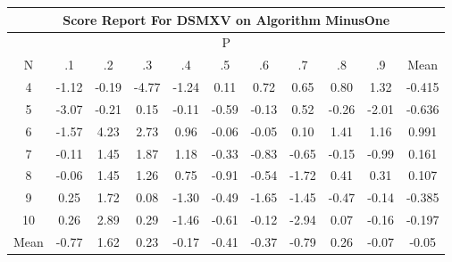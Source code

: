 \documentclass[11pt,a4paper]{report}
\begin{document}
\begin{longtable}{ | c || c | c | c | c | c | c | c | c | c || c |}
\hline
\multicolumn{11}{|c|}{ Score Report For DSMXV on Algorithm MinusOne} \\
\hline
\multicolumn{11}{|c|}{ P } \\
\hline
N & .1 & .2 & .3 & .4 & .5 & .6 & .7 & .8 & .9 & Mean\\
 \hline
 \hline
 \endhead
  4 &  \cellcolor[HTML]{FFDFDF} -1.12 &  \cellcolor[HTML]{FFF7F7} -0.19 &  \cellcolor[HTML]{FF8787} -4.77 &  \cellcolor[HTML]{FFDFDF} -1.24 &  \cellcolor[HTML]{FFFFFF} 0.11 &  \cellcolor[HTML]{EFEFFF} 0.72 &  \cellcolor[HTML]{EFEFFF} 0.65 &  \cellcolor[HTML]{E7E7FF} 0.80 &  \cellcolor[HTML]{DFDFFF} 1.32 & -0.415 \\
  5 &  \cellcolor[HTML]{FFAFAF} -3.07 &  \cellcolor[HTML]{FFF7F7} -0.21 &  \cellcolor[HTML]{FFFFFF} 0.15 &  \cellcolor[HTML]{FFFFFF} -0.11 &  \cellcolor[HTML]{FFEFEF} -0.59 &  \cellcolor[HTML]{FFFFFF} -0.13 &  \cellcolor[HTML]{EFEFFF} 0.52 &  \cellcolor[HTML]{FFF7F7} -0.26 &  \cellcolor[HTML]{FFCFCF} -2.01 & -0.636 \\
  6 &  \cellcolor[HTML]{FFD7D7} -1.57 &  \cellcolor[HTML]{9797FF} 4.23 &  \cellcolor[HTML]{B7B7FF} 2.73 &  \cellcolor[HTML]{E7E7FF} 0.96 &  \cellcolor[HTML]{FFFFFF} -0.06 &  \cellcolor[HTML]{FFFFFF} -0.05 &  \cellcolor[HTML]{FFFFFF} 0.10 &  \cellcolor[HTML]{DFDFFF} 1.41 &  \cellcolor[HTML]{DFDFFF} 1.16 & 0.991 \\
  7 &  \cellcolor[HTML]{FFFFFF} -0.11 &  \cellcolor[HTML]{D7D7FF} 1.45 &  \cellcolor[HTML]{CFCFFF} 1.87 &  \cellcolor[HTML]{DFDFFF} 1.18 &  \cellcolor[HTML]{FFF7F7} -0.33 &  \cellcolor[HTML]{FFE7E7} -0.83 &  \cellcolor[HTML]{FFEFEF} -0.65 &  \cellcolor[HTML]{FFFFFF} -0.15 &  \cellcolor[HTML]{FFE7E7} -0.99 & 0.161 \\
  8 &  \cellcolor[HTML]{FFFFFF} -0.06 &  \cellcolor[HTML]{D7D7FF} 1.45 &  \cellcolor[HTML]{DFDFFF} 1.26 &  \cellcolor[HTML]{EFEFFF} 0.75 &  \cellcolor[HTML]{FFE7E7} -0.91 &  \cellcolor[HTML]{FFEFEF} -0.54 &  \cellcolor[HTML]{FFD7D7} -1.72 &  \cellcolor[HTML]{F7F7FF} 0.41 &  \cellcolor[HTML]{F7F7FF} 0.31 & 0.107 \\
  9 &  \cellcolor[HTML]{F7F7FF} 0.25 &  \cellcolor[HTML]{D7D7FF} 1.72 &  \cellcolor[HTML]{FFFFFF} 0.08 &  \cellcolor[HTML]{FFDFDF} -1.30 &  \cellcolor[HTML]{FFEFEF} -0.49 &  \cellcolor[HTML]{FFD7D7} -1.65 &  \cellcolor[HTML]{FFD7D7} -1.45 &  \cellcolor[HTML]{FFF7F7} -0.47 &  \cellcolor[HTML]{FFFFFF} -0.14 & -0.385 \\
  10 &  \cellcolor[HTML]{F7F7FF} 0.26 &  \cellcolor[HTML]{B7B7FF} 2.89 &  \cellcolor[HTML]{F7F7FF} 0.29 &  \cellcolor[HTML]{FFD7D7} -1.46 &  \cellcolor[HTML]{FFEFEF} -0.61 &  \cellcolor[HTML]{FFFFFF} -0.12 &  \cellcolor[HTML]{FFB7B7} -2.94 &  \cellcolor[HTML]{FFFFFF} 0.07 &  \cellcolor[HTML]{FFF7F7} -0.16 & -0.197 \\
 \hline
 \hline
Mean &  \cellcolor[HTML]{FFEFEF} -0.77 &  \cellcolor[HTML]{D7D7FF} 1.62 &  \cellcolor[HTML]{F7F7FF} 0.23 &  \cellcolor[HTML]{FFF7F7} -0.17 &  \cellcolor[HTML]{FFF7F7} -0.41 &  \cellcolor[HTML]{FFF7F7} -0.37 &  \cellcolor[HTML]{FFEFEF} -0.79 &  \cellcolor[HTML]{F7F7FF} 0.26 &  \cellcolor[HTML]{FFFFFF} -0.07 &  \cellcolor[HTML]{FFFFFF} -0.05
\end{longtable}
\end{document}
